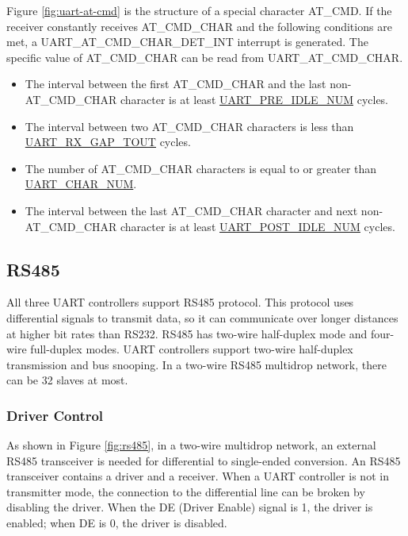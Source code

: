\documentclass[main\_\_EN.tex]{subfiles}
\begin{document}
Figure \ref{fig:uart-at-cmd} is the structure of a special character AT\_CMD. If the receiver constantly receives AT\_CMD\_CHAR and the following conditions are met, a UART\_AT\_CMD\_CHAR\_DET\_INT interrupt is generated. The specific value of AT\_CMD\_CHAR can be read from UART\_AT\_CMD\_CHAR.

\begin{itemize}
    \item The interval between the first AT\_CMD\_CHAR and the last non-AT\_CMD\_CHAR character is at least \hyperref[fielddesc:UARTPREIDLENUM]{UART\_PRE\_IDLE\_NUM} cycles.
    \item The interval between two AT\_CMD\_CHAR characters is less than \hyperref[fielddesc:UARTRXGAPTOUT]{UART\_RX\_GAP\_TOUT} cycles.
    \item The number of AT\_CMD\_CHAR characters is equal to or greater than \hyperref[fielddesc:UARTCHARNUM]{UART\_CHAR\_NUM}.
    \item The interval between the last AT\_CMD\_CHAR character and next non-AT\_CMD\_CHAR character is at least \hyperref[fielddesc:UARTPOSTIDLENUM]{UART\_POST\_IDLE\_NUM} cycles.
\end{itemize}

\subsection{RS485}

All three UART controllers support RS485 protocol. This protocol uses differential signals to transmit data, so it can communicate over longer distances at higher bit rates than RS232. RS485 has two-wire half-duplex mode and four-wire full-duplex modes. UART controllers support two-wire half-duplex transmission and bus snooping. In a two-wire RS485 multidrop network, there can be 32 slaves at most.

\subsubsection{Driver Control}

As shown in Figure \ref{fig:rs485}, in a two-wire multidrop network, an external RS485 transceiver is needed for differential to single-ended conversion. An RS485 transceiver contains a driver and a receiver. When a UART controller is not in transmitter mode, the connection to the differential line can be broken by disabling the driver. When the DE (Driver Enable) signal is 1, the driver is enabled; when DE is 0, the driver is disabled.
\end{document}
